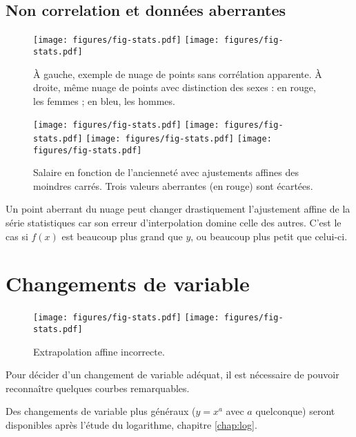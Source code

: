 \subsection{Non correlation et données aberrantes}

\begin{figure}
	\centering
	\texttt{[image: figures/fig-stats.pdf]}
	\texttt{[image: figures/fig-stats.pdf]}
	\caption{À gauche, exemple de nuage de points sans corrélation apparente. À droite, même nuage de points avec distinction des sexes : en rouge, les femmes ; en bleu, les hommes.}
\end{figure}

\begin{figure}
	\centering
	\texttt{[image: figures/fig-stats.pdf]}
	\texttt{[image: figures/fig-stats.pdf]}
	\texttt{[image: figures/fig-stats.pdf]}
	\texttt{[image: figures/fig-stats.pdf]}
	\caption{Salaire en fonction de l'ancienneté avec ajustements affines des moindres carrés. Trois valeurs aberrantes (en rouge) sont écartées.}
\end{figure}


Un point aberrant du nuage peut changer drastiquement l'ajustement affine de la série statistiques car son erreur d'interpolation domine celle des autres.
C'est le cas si $f(x)$ est beaucoup plus grand que $y$, ou beaucoup plus petit que celui-ci.


\section{Changements de variable}


\begin{figure}
	\centering
	\texttt{[image: figures/fig-stats.pdf]}
	\texttt{[image: figures/fig-stats.pdf]}
	\caption{Extrapolation affine incorrecte.}
\end{figure}

Pour décider d'un changement de variable adéquat, il est nécessaire de pouvoir reconnaître quelques courbes remarquables.



Des changements de variable plus généraux ($y=x^a$ avec $a$ quelconque) seront disponibles après l'étude du logarithme, chapitre \ref{chap:log}.



